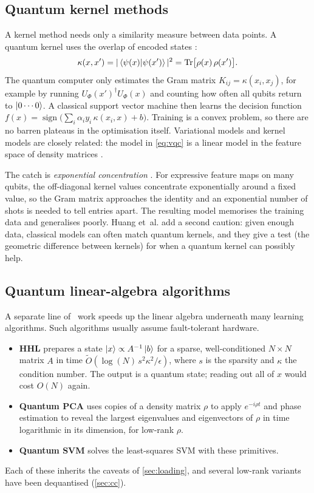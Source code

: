 \documentclass[11pt,a4paper]{article}
\begin{document}
\subsection{Quantum kernel methods}
\label{sec:kernels}
A kernel method needs only a similarity measure between data points. A quantum kernel uses the
overlap of encoded states \citep{havlicek2019,schuld2019feature}:
\begin{equation}
  \kappa(x,x')=|\braket{\psi(x)|\psi(x')}|^2=\operatorname{Tr}\!\big[\rho(x)\,\rho(x')\big].
\end{equation}
The quantum computer only estimates the Gram matrix $K_{ij}=\kappa(x_i,x_j)$, for example by running
$U_\Phi(x')^\dagger U_\Phi(x)$ and counting how often all qubits return to $\ket{0\cdots0}$. A
classical support vector machine then learns the decision function
$f(x)=\operatorname{sign}\big(\sum_i\alpha_iy_i\,\kappa(x_i,x)+b\big)$. Training is a convex problem,
so there are no barren plateaus in the optimisation itself. Variational models and kernel models are
closely related: the model in \cref{eq:vqc} is a linear model in the feature space of density
matrices \citep{schuld2021book}.

The catch is \emph{exponential concentration} \citep{thanasilp2024}. For expressive feature maps on
many qubits, the off-diagonal kernel values concentrate exponentially around a fixed value, so the
Gram matrix approaches the identity and an exponential number of shots is needed to tell entries
apart. The resulting model memorises the training data and generalises poorly. Huang
et~al. \citeyearpar{huang2021power} add a second caution: given enough data, classical models can often
match quantum kernels, and they give a test (the geometric difference between kernels) for when a
quantum kernel can possibly help.

\subsection{Quantum linear-algebra algorithms}
A separate line of \CQ\ work speeds up the linear algebra underneath many learning algorithms. Such
algorithms usually assume fault-tolerant hardware.
\begin{itemize}
  \item \textbf{HHL} \citep{harrow2009} prepares a state $\ket{x}\propto A^{-1}\ket{b}$ for a sparse,
        well-conditioned $N\times N$ matrix $A$ in time $\tilde{O}(\log(N)\,s^2\kappa^2/\epsilon)$,
        where $s$ is the sparsity and $\kappa$ the condition number. The output is a quantum state;
        reading out all of $x$ would cost $O(N)$ again.
  \item \textbf{Quantum PCA} \citep{lloyd2014qpca} uses copies of a density matrix $\rho$ to apply
        $e^{-i\rho t}$ and phase estimation to reveal the largest eigenvalues and eigenvectors of
        $\rho$ in time logarithmic in its dimension, for low-rank $\rho$.
  \item \textbf{Quantum SVM} \citep{rebentrost2014} solves the least-squares SVM with these
        primitives.
\end{itemize}
Each of these inherits the caveats of \cref{sec:loading}, and several low-rank variants have been
dequantised (\cref{sec:cc}).
\end{document}
